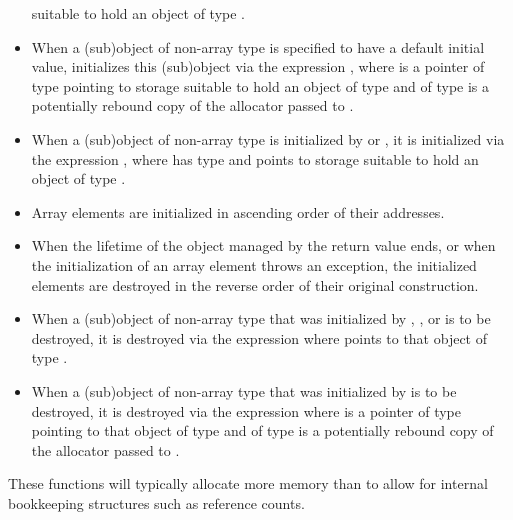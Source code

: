 \begin{itemdescr}
\begin{itemize}
  suitable to hold an object of type .
\item
  When a (sub)object of non-array type  is specified to have
  a default initial value,
   initializes this (sub)object
  via the expression ,
  where  is a pointer of type 
  pointing to storage
  suitable to hold an object of type  and
   of type  is a potentially rebound copy of
  the allocator  passed to .
\item
  When a (sub)object of non-array type  is initialized by
   or\linebreak %
  ,
  it is initialized via the expression ,
  where  has type  and
  points to storage suitable to hold an object of type .
\item
  Array elements are initialized in ascending order of their addresses.
\item
  When the lifetime of the object managed by the return value ends, or
  when the initialization of an array element throws an exception,
  the initialized elements are destroyed in the reverse order
  of their original construction.
\item
  When a (sub)object of non-array type 
  that was initialized by ,
  , or 
  is to be destroyed,
  it is destroyed via the expression  where
   points to that object of type .
\item
  When a (sub)object of non-array type 
  that was initialized by  is to be destroyed,
  it is destroyed via the expression
   where
   is a pointer of type 
  pointing to that object of type  and
   of type  is a potentially rebound copy of
  the allocator  passed to .
\end{itemize}
\begin{note}
These functions will typically allocate more memory than  to
allow for internal bookkeeping structures such as reference counts.
\end{note}
\end{itemdescr}

